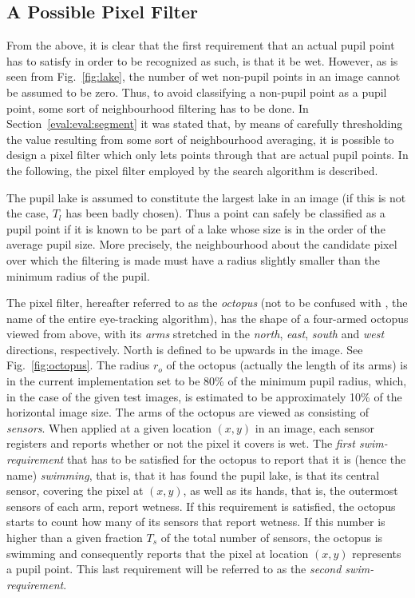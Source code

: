 \subsection{A Possible Pixel Filter}
\label{algo:seek:filter}

From the above, it is clear that the first requirement that an actual
pupil point has to satisfy in order to be recognized as such, is that
it be wet.  However, as is seen from Fig.~\ref{fig:lake}, the number
of wet non-pupil points in an image cannot be assumed to be zero.
Thus, to avoid classifying a non-pupil point as a pupil point, some
sort of neighbourhood filtering has to be done.  In
Section~\ref{eval:eval:segment} it was stated that, by means of
carefully thresholding the value resulting from some sort of
neighbourhood averaging, it is possible to design a pixel filter which
only lets points through that are actual pupil points.  In the
following, the pixel filter employed by the search algorithm is
described.

The pupil lake is assumed to constitute the largest lake in an image
(if this is not the case, $T_{l}$ has been badly chosen).  Thus a point
can safely be classified as a pupil point if it is known to be part of
a lake whose size is in the order of the average pupil size.  More
precisely, the neighbourhood about the candidate pixel over which the
filtering is made must have a radius slightly smaller than the minimum
radius of the pupil.  

The pixel filter, hereafter referred to as the {\em octopus\/} (not to
be confused with {\octopus}, the name of the entire eye-tracking
algorithm), has the shape of a four-armed octopus viewed from above,
with its {\em arms\/} stretched in the {\em north\/}, {\em east\/},
{\em south\/} and {\em west\/} directions, respectively.  North is
defined to be upwards in the image.  See Fig.~\ref{fig:octopus}.  The
radius $r_{o}$ of the octopus (actually the length of its arms) is in
the current implementation set to be 80\% of the minimum pupil radius,
which, in the case of the given test images, is estimated to be
approximately 10\% of the horizontal image size.  The arms of the
octopus are viewed as consisting of {\em sensors\/}.  When applied at
a given location $(x,y)$ in an image, each sensor registers and
reports whether or not the pixel it covers is wet.  The {\em first
  swim-requirement\/} that has to be satisfied for the octopus to
report that it is (hence the name) {\em swimming\/}, that is, that it
has found the pupil lake, is that its central sensor, covering the
pixel at $(x,y)$, as well as its hands, that is, the outermost sensors
of each arm, report wetness.  If this requirement is satisfied, the
octopus starts to count how many of its sensors that report wetness.
If this number is higher than a given fraction $T_{s}$ of the total
number of sensors, the octopus is swimming and consequently reports
that the pixel at location $(x,y)$ represents a pupil point.  This
last requirement will be referred to as the {\em second
  swim-requirement\/}.

